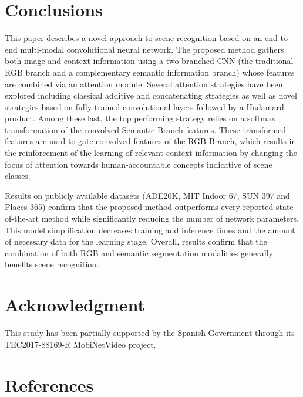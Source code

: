 \documentclass[review, 3p, sort&compress]{elsarticle}
\begin{document}
\section{Conclusions}\label{sec:Conclusions}
This paper describes a novel approach to scene recognition based on an end-to-end multi-modal convolutional neural network. The proposed method gathers both image and context information using a two-branched CNN (the traditional RGB branch and a complementary semantic information branch) whose features are combined via an attention module. Several attention strategies have been explored including classical additive and concatenating strategies as well as novel strategies based on fully trained convolutional layers followed by a Hadamard product. Among these last, the top performing strategy relies on a softmax transformation of the convolved Semantic Branch features. These transformed features are used to gate convolved features of the RGB Branch, which results in the reinforcement of the learning of relevant context information by changing the focus of attention towards human-accountable concepts indicative of scene classes. 

Results on publicly available datasets (ADE20K, MIT Indoor 67, SUN 397 and Places 365) confirm that the proposed method outperforms every reported state-of-the-art method while significantly reducing the number of network parameters. This model simplification decreases training and inference times and the amount of necessary data for the learning stage. Overall, results confirm that the combination of both RGB and semantic segmentation modalities generally benefits scene recognition.

\section*{Acknowledgment}
This study has been partially supported by the Spanish Government through its TEC2017-88169-R MobiNetVideo project.

\section*{References}


\end{document}
